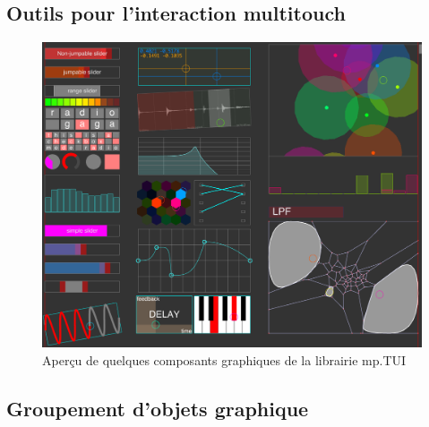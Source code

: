 \subsection{Outils pour l'interaction multitouch}


\begin{figure}[!htbp]
	\includegraphics[width=\textwidth]{gfx/mpTUI/mp-TUI-preview.png}
	\caption{Aperçu de quelques composants graphiques de la librairie mp.TUI}
	\label{fig:visual_representation:mp.TUI}
\end{figure}



\subsection{Groupement d'objets graphique}

